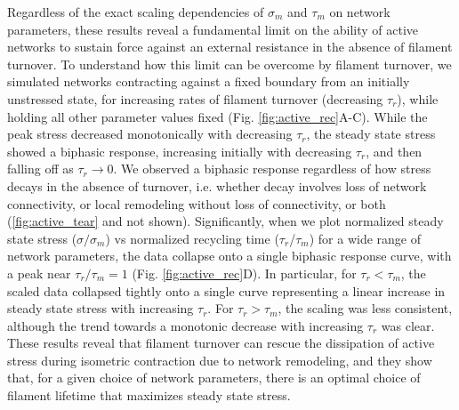 Regardless of the exact scaling dependencies of $\sigma_m$ and $\tau_m$ on network parameters, these results reveal a fundamental limit on the ability of active networks to sustain force against an external resistance in the absence of filament turnover.  To understand how this limit can be overcome by filament turnover, we simulated networks contracting against a fixed boundary from an initially unstressed state, for increasing rates of filament turnover (decreasing $\tau_r$), while holding all other parameter values fixed (Fig. \ref{fig:active_rec}A-C). While the peak stress decreased monotonically with decreasing $\tau_r$, the steady state stress showed a biphasic response, increasing initially with decreasing $\tau_r$, and then falling off as $\tau_r \to 0$.  We observed a biphasic response regardless of how stress decays in the absence of turnover, i.e. whether decay involves loss of network connectivity, or local remodeling without loss of connectivity, or both (\ref{fig:active_tear} and not shown). Significantly, when we plot normalized steady state stress ($\sigma/\sigma_m$) vs normalized recycling time ($\tau_r$/$\tau_m$) for a wide range of network parameters, the data collapse onto a single biphasic response curve, with a peak near $\tau_r/\tau_m = 1$ (Fig. \ref{fig:active_rec}D). In particular, for $\tau_r < \tau_m$, the scaled data collapsed tightly onto a single curve representing a linear increase in steady state stress with increasing $\tau_r$. For $\tau_r > \tau_m$, the scaling was less consistent, although the trend towards a monotonic decrease with increasing $\tau_r$ was clear. These results reveal that filament turnover can rescue the dissipation of active stress during isometric contraction due to network remodeling, and they show that, for a given choice of network parameters, there is an optimal choice of filament lifetime that maximizes steady state stress.

